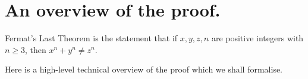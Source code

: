 \chapter{An overview of the proof.}

Fermat's Last Theorem is the statement that if $x,y,z,n$ are positive integers with $n\geq 3$, then $x^n+y^n\not=z^n$.

Here is a high-level technical overview of the proof which we shall formalise.


